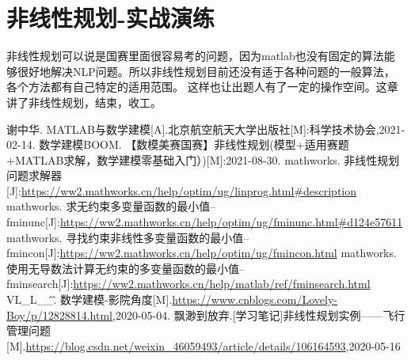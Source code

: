 \documentclass[a4paper,20pt]{article}
\begin{document}
\section{非线性规划-实战演练}
非线性规划可以说是国赛里面很容易考的问题，因为matlab也没有固定的算法能够很好地解决NLP问题。所以非线性规划目前还没有适于各种问题的一般算法，各个方法都有自己特定的适用范围。
这样也让出题人有了一定的操作空间。这章讲了非线性规划，结束，收工。
\newpage
\begin{thebibliography}{99}

    谢中华. MATLAB与数学建模[A].北京航空航天大学出版社[M]:科学技术协会,2021-02-14.
    数学建模BOOM. 【数模美赛国赛】非线性规划(模型+适用赛题+MATLAB求解，数学建模零基础入门）)[M]:2021-08-30.
    mathworks. 非线性规划问题求解器[J]:\url{https://ww2.mathworks.cn/help/optim/ug/linprog.html#description}
    mathworks. 求无约束多变量函数的最小值--fminunc[J]:\url{https://ww2.mathworks.cn/help/optim/ug/fminunc.html#d124e57611}
    mathworks. 寻找约束非线性多变量函数的最小值--fmincon[J]:\url{https://ww2.mathworks.cn/help/optim/ug/fmincon.html}
    mathworks. 使用无导数法计算无约束的多变量函数的最小值--fminsearch[J]:\url{https://ww2.mathworks.cn/help/matlab/ref/fminsearch.html}
    VL\_L\_\^\_\^. 数学建模-影院角度[M].\url{https://www.cnblogs.com/Lovely-Boy/p/12828814.html},2020-05-04.
    飘渺到放弃.[学习笔记]非线性规划实例——飞行管理问题[M].\url{https://blog.csdn.net/weixin_46059493/article/details/106164593},2020-05-16

\end{thebibliography}
\newpage
\end{document}
